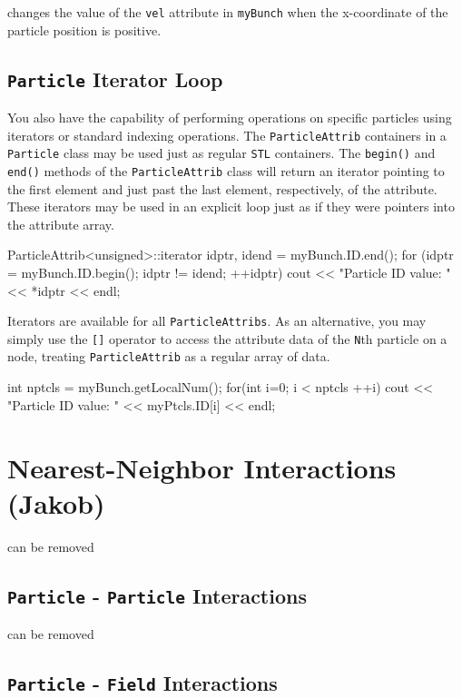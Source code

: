 changes the value of the \texttt{vel} attribute in \texttt{myBunch} when the x-coordinate of the particle position is positive.

\subsection{\texttt{Particle} Iterator Loop}

You also have the capability of performing operations on specific particles using iterators or standard indexing operations. The \texttt{ParticleAttrib} containers in a \texttt{Particle} class may be used just as regular \texttt{STL} containers. The \texttt{begin()} and \texttt{end()} methods of the \texttt{ParticleAttrib} class will return an iterator pointing to the first element and just past the last element, respectively, of the attribute. These iterators may be used in an explicit loop just as if they were pointers into the attribute array.
\begin{smallcode}
ParticleAttrib<unsigned>::iterator idptr, idend = myBunch.ID.end(); 
for (idptr = myBunch.ID.begin(); idptr != idend; ++idptr) 
    cout << "Particle ID value: " << *idptr << endl; 
\end{smallcode}


Iterators are available for all \texttt{ParticleAttribs}. As an alternative, you may simply use the \texttt{[]} operator to access the attribute data of the \texttt{N}th particle on a node, treating \texttt{ParticleAttrib} as a regular array of data.
\begin{smallcode}
int nptcls = myBunch.getLocalNum(); 
for(int i=0; i < nptcls ++i) { 
    cout << "Particle ID value: " << myPtcls.ID[i] << endl; 
}
\end{smallcode}


\section{{\color{red}Nearest-Neighbor Interactions (Jakob)}}
{\color{red} can be removed}


\subsection{{\color{red}\texttt{Particle} - \texttt{Particle} Interactions}}
{\color{red} can be removed}

\subsection{\texttt{Particle} - \texttt{Field} Interactions}

